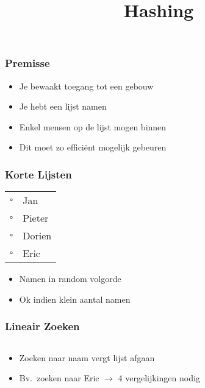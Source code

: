 \documentclass[dutch]{ucll-slides}
\title{Hashing}
\begin{document}
\maketitle

\begin{frame}
  \frametitle{Premisse}
  \begin{itemize}
    \item Je bewaakt toegang tot een gebouw
    \item Je hebt een lijst namen
    \item Enkel mensen op de lijst mogen binnen
    \item Dit moet zo effici\"ent mogelijk gebeuren
  \end{itemize}
\end{frame}

\begin{frame}
  \frametitle{Korte Lijsten}
  \begin{center}
    \begin{tabular}{rl}
      $\square$ & Jan \\
      $\square$ & Pieter \\
      $\square$ & Dorien \\
      $\square$ & Eric \\
    \end{tabular}
  \end{center}
  \begin{itemize}
    \item Namen in random volgorde
    \item Ok indien klein aantal namen
  \end{itemize}
\end{frame}

\begin{frame}
  \frametitle{Lineair Zoeken}
  \begin{columns}
    \column{4cm}
    \begin{center}
    \end{center}

    \column{6cm}
  \end{columns}
  \vskip5mm
  \begin{itemize}
    \item Zoeken naar naam vergt lijst afgaan
    \item Bv.~zoeken naar Eric $\rightarrow$ 4 vergelijkingen nodig
  \end{itemize}
\end{frame}
\end{document}
